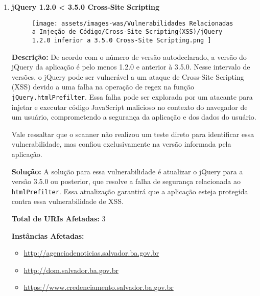 \documentclass[a4paper,12pt]{article}
\begin{document}
\begin{enumerate}
\item \textbf{jQuery 1.2.0 < 3.5.0 Cross-Site Scripting}

                        \begin{figure}[h!]
                        \centering
                        \texttt{[image: assets/images-was/Vulnerabilidades Relacionadas a Injeção de Código/Cross-Site Scripting(XSS)/jQuery 1.2.0 inferior a 3.5.0 Cross-Site Scripting.png ]}
                        \end{figure}
                        \FloatBarrier
                        \textbf{Descrição:} De acordo com o número de versão autodeclarado, a versão do jQuery da aplicação é pelo menos 1.2.0 e anterior à 3.5.0. Nesse intervalo de versões, o jQuery pode ser vulnerável a um ataque de Cross-Site Scripting (XSS) devido a uma falha na operação de regex na função \texttt{jQuery.htmlPrefilter}. Essa falha pode ser explorada por um atacante para injetar e executar código JavaScript malicioso no contexto do navegador de um usuário, comprometendo a segurança da aplicação e dos dados do usuário.

    Vale ressaltar que o scanner não realizou um teste direto para identificar essa vulnerabilidade, mas confiou exclusivamente na versão informada pela aplicação.

\textbf{Solução:} A solução para essa vulnerabilidade é atualizar o jQuery para a versão 3.5.0 ou posterior, que resolve a falha de segurança relacionada ao \texttt{htmlPrefilter}. Essa atualização garantirá que a aplicação esteja protegida contra essa vulnerabilidade de XSS.

\textbf{Total de URIs Afetadas:} 3

\textbf{Instâncias Afetadas:}
\begin{itemize}
    \item \url{http://agenciadenoticias.salvador.ba.gov.br}
    \item \url{http://dom.salvador.ba.gov.br}
    \item \url{https://www.credenciamento.salvador.ba.gov.br}
\end{itemize}

\end{enumerate}
\end{document}
